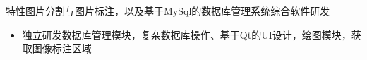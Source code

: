 \documentclass{resume}
\begin{document}
\begin{onehalfspacing}
特性图片分割与图片标注，以及基于MySql的数据库管理系统综合软件研发
\begin{itemize}
  \item 独立研发数据库管理模块，复杂数据库操作、基于Qt的UI设计，绘图模块，获取图像标注区域
\end{itemize}
\end{onehalfspacing}



\end{document}
